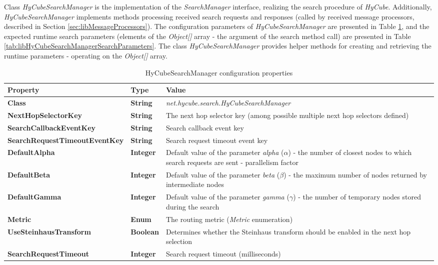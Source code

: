 Class \emph{HyCubeSearchManager} is the implementation of the \emph{SearchManager} interface, realizing the search procedure of \emph{HyCube}. Additionally, \emph{HyCubeSearchManager} implements methods processing received search requests and responses (called by received message processors, described in Section \ref{sec:libMessageProcessors}). The configuration parameters of \emph{HyCubeSearchManager} are presented in Table \ref{tab:libHyCubeSearchManager}, and the expected runtime search parameters (elements of the \emph{Object[]} array - the argument of the search method call) are presented in Table \ref{tab:libHyCubeSearchManagerSearchParameters}. The class \emph{HyCubeSearchManager} provides helper methods for creating and retrieving the runtime parameters - operating on the \emph{Object[]} array.


\begin{table}
\scriptsize
\begin{center}
\begin{tabular}{p{4cm} p{2cm} p{8.5cm}}
	\hline
	\textbf{Property}						& \textbf{Type}					& \textbf{Value}					\\[1mm]
    \hline
	\textbf{Class}							& \textbf{String}				& \textit{net.hycube.search.HyCubeSearchManager}										\\[1.5mm]	
    \textbf{NextHopSelectorKey}				& \textbf{String}				& The next hop selector key (among possible multiple next hop selectors defined)		\\[1.5mm]	
	\textbf{SearchCallbackEventKey}			& \textbf{String}				& Search callback event key				\\[1.5mm]	
	\textbf{SearchRequestTimeoutEventKey}	& \textbf{String}				& Search request timeout event key		\\[1.5mm]	
	\textbf{DefaultAlpha}					& \textbf{Integer}				& Default value of the parameter \emph{alpha} ($\alpha$) - the number of closest nodes to which search requests are sent - parallelism factor		\\[1.5mm]	
	\textbf{DefaultBeta}					& \textbf{Integer}				& Default value of the parameter \emph{beta} ($\beta$) - the maximum number of nodes returned by intermediate nodes		\\[1.5mm]	
	\textbf{DefaultGamma}					& \textbf{Integer}				& Default value of the parameter \emph{gamma} ($\gamma$) - the number of temporary nodes stored during the search		\\[1.5mm]	
	\textbf{Metric}							& \textbf{Enum}					& The routing metric (\emph{Metric} enumeration)											\\[1.5mm]
	\textbf{UseSteinhausTransform}			& \textbf{Boolean}				& Determines whether the Steinhaus transform should be enabled in the next hop selection				\\[1.5mm]	
	\textbf{SearchRequestTimeout}			& \textbf{Integer}				& Search request timeout (milliseconds) 			\\[1.5mm]	
    \hline
\end{tabular}
\end{center}
\caption{HyCubeSearchManager configuration properties}
\label{tab:libHyCubeSearchManager}
\end{table}

